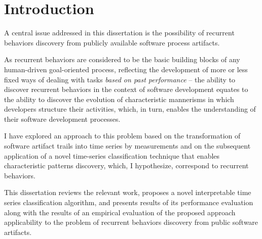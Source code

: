 \chapter{Introduction}\label{chapter_introduction}
A central issue addressed in this dissertation is the possibility of recurrent behaviors discovery 
from publicly available software process artifacts. 

As recurrent behaviors are considered to be the basic building blocks of any human-driven
goal-oriented process, reflecting the development of more or less fixed ways of dealing 
with tasks \textit{based on past performance} \cite{neal2012habits} \cite{1903} -- 
the ability to discover recurrent behaviors in the context of software development equates 
to the ability to discover the evolution of characteristic mannerisms in which developers 
structure their activities, which, in turn, enables the understanding of their software 
development processes.  

I have explored an approach to this problem based on the transformation of software artifact trails 
into time series by measurements and on the subsequent application of a novel time-series 
classification technique that enables characteristic patterns discovery, which, 
I hypothesize, correspond to recurrent behaviors.

This dissertation reviews the relevant work, proposes a novel interpretable time series 
classification algorithm, and presents results of its performance evaluation along with 
the results of an empirical evaluation of the proposed approach applicability to the problem 
of recurrent behaviors discovery from public software artifacts.


